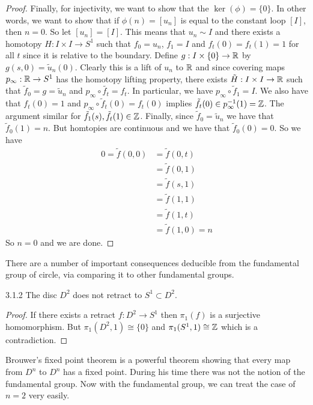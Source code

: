 \documentclass[a4paper]{article}
\begin{document}
\begin{thm}{}{}
\begin{proof}
Finally, for injectivity, we want to show that the $\ker(\phi)=\{0\}$. In other words, we want to show that if $\phi(n)=[u_n]$ is equal to the constant loop $[I]$, then $n=0$. So let $[u_n]=[I]$. This means that $u_n\sim I$ and there exists a homotopy $H:I\times I\to S^1$ such that $f_0=u_n$, $f_1=I$ and $f_t(0)=f_t(1)=1$ for all $t$ since it is relative to the boundary. Define $g:I\times\{0\}\to\mathbb{R}$ by $g(s,0)=\tilde{u}_n(0)$. Clearly this is a lift of $u_n$ to $\mathbb{R}$ and since covering maps $p_\infty:\mathbb{R}\to S^1$ has the homotopy lifting property, there exists $\tilde{H}:I\times I\to\mathbb{R}$ such that $\tilde{f}_0=g=\tilde{u}_n$ and $p_\infty\circ\tilde{f_t}=f_t$. In particular, we have $p_\infty\circ\tilde{f}_1=I$. We also have that $f_t(0)=1$ and $p_\infty\circ\tilde{f}_t(0)=f_t(0)$ implies $\tilde{f}_t(0)\in p_\infty^{-1}(1)=\mathbb{Z}$. The argument similar for $\tilde{f}_1(s),\tilde{f}_t(1)\in\mathbb{Z}$. Finally, since $\tilde{f}_0=\tilde{u}_n$ we have that $\tilde{f}_0(1)=n$. But homtopies are continuous and we have that $\tilde{f}_0(0)=0$. So we have 
\begin{align*}
0=\tilde{f}(0,0)&=\tilde{f}(0,t)\tag{Continuity in $t$ and takes value in $\Z$}\\
&=\tilde{f}(0,1)\tag{Take $t=1$}\\
&=\tilde{f}(s,1)\tag{Continuity in $s$ and takes value in $\Z$}\\
&=\tilde{f}(1,1)\tag{Take $s=1$}\\
&=\tilde{f}(1,t)\tag{Continuity in $t$ and takes value in $\Z$}\\
&=\tilde{f}(1,0)=n
\end{align*}
So $n=0$ and we are done. 
\end{proof}
\end{thm}

There are a number of important consequences deducible from the fundamental group of circle, via comparing it to other fundamental groups. 

\begin{thm}{}{3.1.2} The disc $D^2$ does not retract to $S^1\subset D^2$. \tcbline
\begin{proof}
If there exists a retract $f:D^2\to S^1$ then $\pi_1(f)$ is a surjective homomorphism. But $\pi_1	(D^2,1)\cong\{0\}$ and $\pi_1(S^1,1)\cong\mathbb{Z}$ which is a contradiction. 
\end{proof}
\end{thm}

Brouwer's fixed point theorem is a powerful theorem showing that every map from $D^n$ to $D^n$ has a fixed point. During his time there was not the notion of the fundamental group. Now with the fundamental group, we can treat the case of $n=2$ very easily. 
\end{document}

